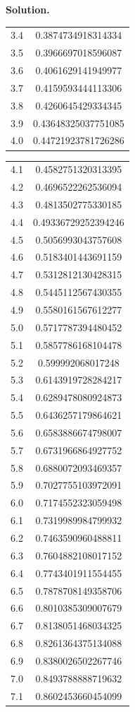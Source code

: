\documentclass[11pt, letterpaper]{report}
\newenvironment{soln}[1][]{\noindent\textbf{Solution. }}{\hfill\qedsymbol}
\begin{document}
\begin{soln}
\begin{center}
\begin{tabular}{c|c}
3.4&0.3874734918314334\\
3.5&0.3966697018596087\\
3.6&0.4061629141949977\\
3.7&0.4159593444113306\\
3.8&0.4260645429334345\\
3.9&0.43648325037751085\\
4.0&0.44721923781726286\\
		\end{tabular}
		\begin{tabular}{c|c}
			\hline
4.1&0.4582751320313395\\
4.2&0.4696522262536094\\
4.3&0.4813502775330185\\
4.4&0.49336729252394246\\
4.5&0.5056993043757608\\
4.6&0.5183401443691159\\
4.7&0.5312812130428315\\
4.8&0.5445112567430355\\
4.9&0.5580161567612277\\
5.0&0.5717787394480452\\
5.1&0.5857786168104478\\
5.2&0.599992068017248\\
5.3&0.6143919728284217\\
5.4&0.6289478080924873\\
5.5&0.6436257179864621\\
5.6&0.6583886674798007\\
5.7&0.6731966864927752\\
5.8&0.6880072093469357\\
5.9&0.7027755103972091\\
   6.0&0.7174552323059498\\
6.1&0.7319989984799932\\
6.2&0.7463590960488811\\
6.3&0.7604882108017152\\
6.4&0.7743401911554455\\
6.5&0.7878708149358706\\
6.6&0.8010385309007679\\
6.7&0.8138051468034325\\
6.8&0.8261364375134088\\
6.9&0.8380026502267746\\
7.0&0.8493788888719632\\
7.1&0.8602453660454099\\

\end{tabular}
\end{center}
\end{soln}
\end{document}
